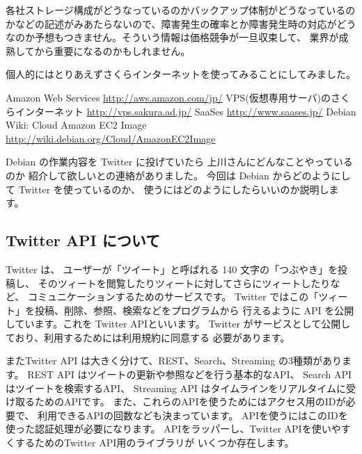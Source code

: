 \documentclass[mingoth,a4paper]{jsarticle}
\begin{document}
各社ストレージ構成がどうなっているのかバックアップ体制がどうなっているの
かなどの記述がみあたらないので、障害発生の確率とか障害発生時の対応がどう
なのか予想もつきません。そういう情報は価格競争が一旦収束して、
業界が成熟してから重要になるのかもしれません。

個人的にはとりあえずさくらインターネットを使ってみることにしてみました。

\begin{thebibliography}{0}
  Amazon Web Services \url{http://aws.amazon.com/jp/}
  VPS(仮想専用サーバ)のさくらインターネット
	 \url{http://vps.sakura.ad.jp/}
  SaaSes \url{http://www.saases.jp/}
  Debian Wiki: Cloud Amazon EC2 Image \url{http://wiki.debian.org/Cloud/AmazonEC2Image}
\end{thebibliography}


Debian の作業内容を Twitter に投げていたら 上川さんにどんなことやっているのか
紹介して欲しいとの連絡がありました。
今回は Debian からどのようにして Twitter を使っているのか、
使うにはどのようにしたらいいのか説明します。

\subsection{Twitter API について}

Twitter は、 ユーザーが「ツイート」と呼ばれる 140 文字の「つぶやき」を投稿し、 
そのツィートを閲覧したりツィートに対してさらにツィートしたりなど、
コミュニケーションするためのサービスです。
Twitter ではこの「ツィート」を投稿、削除、参照、検索などをプログラムから
行えるように API を公開しています。これを Twitter APIといいます。
Twitter がサービスとして公開しており、利用するためには利用規約に同意する
必要があります。

またTwitter API は大きく分けて、REST、Search、Streaming の3種類があります。
REST API はツイートの更新や参照などを行う基本的なAPI、
Search API はツイートを検索するAPI、
Streaming API はタイムラインをリアルタイムに受け取るためのAPIです。
また、これらのAPIを使うためにはアクセス用のIDが必要で、
利用できるAPIの回数なども決まっています。
APIを使うにはこのIDを使った認証処理が必要になります。
APIをラッパーし、Twitter APIを使いやすくするためのTwitter API用のライブラリが
いくつか存在します。
\end{document}
